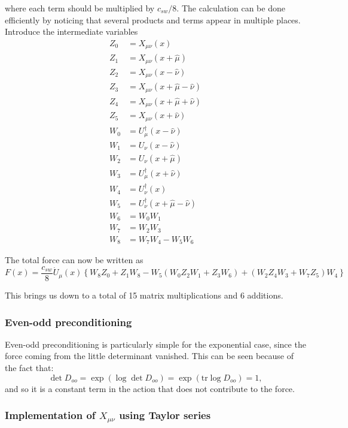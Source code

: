 \documentclass[12pt]{article}
\newcommand{\tr}{\mathrm{tr}}
\begin{document}
where each term should be multiplied by $c_{sw}/8$. The calculation can be done efficiently by noticing that several products and terms appear in multiple places. Introduce the intermediate variables
\begin{align}
 Z_0 &= X_{\mu\nu}(x) \\
 Z_1 &= X_{\mu\nu}(x+\hat{\mu}) \\
 Z_2 &= X_{\mu\nu}(x-\hat{\nu}) \\
 Z_3 &= X_{\mu\nu}(x+\hat{\mu}-\hat{\nu}) \\
 Z_4 &= X_{\mu\nu}(x+\hat{\mu}+\hat{\nu}) \\
 Z_5 &= X_{\mu\nu}(x+\hat{\nu}) \\
 W_0 &= U_\mu^\dagger(x-\hat{\nu}) \\
 W_1 &= U_\nu(x-\hat{\nu}) \\
 W_2 &= U_\nu(x+\hat{\mu}) \\
 W_3 &= U_\mu^\dagger(x+\hat{\nu}) \\
 W_4 &= U_\nu^\dagger(x) \\
 W_5 &= U_\nu^\dagger(x+\hat{\mu}-\hat{\nu}) \\
 W_6 &= W_0W_1 \\
 W_7 &= W_2W_3 \\
 W_8 &= W_7W_4-W_5W_6
\end{align}

The total force can now be written as
\begin{equation}
 F(x) = \frac{c_{sw}}{8}\dot{U}_\mu(x)\left\{W_8Z_0 + Z_1W_8 - W_5(W_0Z_2W_1+Z_3W_6) + (W_2Z_4W_3+W_7Z_5)W_4\right\}
\end{equation}

This brings us down to a total of 15 matrix multiplications and 6 additions.

\subsubsection*{Even-odd preconditioning}

Even-odd preconditioning is particularly simple for the exponential case, since the force coming from the little determinant vanished. This can be seen because of the fact that:
\begin{equation}
\det D_{oo}  = \exp(\log \det D_{oo} ) =\exp( \tr \log D_{oo}) =  1,
\end{equation}
and so it is a constant term in the action that does not contribute to the force.

\subsubsection*{Implementation of  $X_{\mu\nu}$  using Taylor series}
\end{document}

